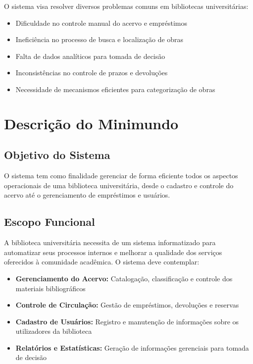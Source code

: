 \documentclass[12pt,a4paper]{article}
\begin{document}
O sistema visa resolver diversos problemas comuns em bibliotecas universitárias:

\begin{itemize}
    \item Dificuldade no controle manual do acervo e empréstimos
    \item Ineficiência no processo de busca e localização de obras
    \item Falta de dados analíticos para tomada de decisão
    \item Inconsistências no controle de prazos e devoluções
    \item Necessidade de mecanismos eficientes para categorização de obras
\end{itemize}

\section{Descrição do Minimundo}

\subsection{Objetivo do Sistema}
O sistema tem como finalidade gerenciar de forma eficiente todos os aspectos operacionais de uma biblioteca universitária, desde o cadastro e controle do acervo até o gerenciamento de empréstimos e usuários.

\subsection{Escopo Funcional}
A biblioteca universitária necessita de um sistema informatizado para automatizar seus processos internos e melhorar a qualidade dos serviços oferecidos à comunidade acadêmica. O sistema deve contemplar:

\begin{infobox}
\begin{itemize}
    \item \textbf{Gerenciamento do Acervo:} Catalogação, classificação e controle dos materiais bibliográficos
    \item \textbf{Controle de Circulação:} Gestão de empréstimos, devoluções e reservas
    \item \textbf{Cadastro de Usuários:} Registro e manutenção de informações sobre os utilizadores da biblioteca
    \item \textbf{Relatórios e Estatísticas:} Geração de informações gerenciais para tomada de decisão
\end{itemize}
\end{infobox}
\end{document}
